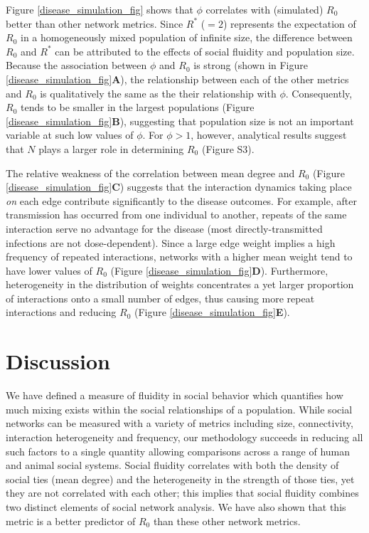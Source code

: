 \documentclass[twocolumn,8pt]{article}
\begin{document}
Figure \ref{disease_simulation_fig} shows that $\phi$ correlates with (simulated) $R_{0}$ better than other network metrics. Since $R^{*}$ ($=2$) represents the expectation of $R_{0}$ in a homogeneously mixed population of infinite size, the difference between $R_{0}$ and $R^{*}$ can be attributed to the effects of social fluidity and population size. Because the association between $\phi$ and $R_{0}$ is strong (shown in Figure \ref{disease_simulation_fig}\textbf{A}), the relationship between each of the other metrics and $R_{0}$ is qualitatively the same as the their relationship with $\phi$. Consequently, $R_{0}$ tends to be smaller in the largest populations (Figure \ref{disease_simulation_fig}\textbf{B}), suggesting that population size is not an important variable at such low values of $\phi$. For $\phi>1$, however, analytical results suggest that $N$ plays a larger role in determining $R_{0}$ (Figure S3).

The relative weakness of the correlation between mean degree and $R_{0}$ (Figure \ref{disease_simulation_fig}\textbf{C}) suggests that the interaction dynamics taking place \emph{on} each edge contribute significantly to the disease outcomes. For example, after transmission has occurred from one individual to another, repeats of the same interaction serve no advantage for the disease (most directly-transmitted infections are not dose-dependent). Since a large edge weight implies a high frequency of repeated interactions, networks with a higher mean weight tend to have lower values of $R_{0}$ (Figure \ref{disease_simulation_fig}\textbf{D}). Furthermore, heterogeneity in the distribution of weights concentrates a yet larger proportion of interactions onto a small number of edges, thus causing more repeat interactions and reducing $R_{0}$ (Figure \ref{disease_simulation_fig}\textbf{E}). 

\section*{Discussion}
We have defined a measure of fluidity in social behavior which quantifies how much mixing exists within the social relationships of a population. While social networks can be measured with a variety of metrics including size, connectivity, interaction heterogeneity and frequency, our methodology succeeds in reducing all such factors to a single quantity allowing comparisons across a range of human and animal social systems. Social fluidity correlates with both the density of social ties (mean degree) and the heterogeneity in the strength of those ties, yet they are not correlated with each other; this implies that social fluidity combines two distinct elements of social network analysis. We have also shown that this metric is a better predictor of $R_{0}$ than these other network metrics.
\end{document}
